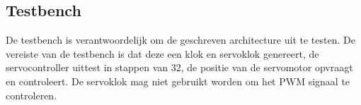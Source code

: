\subsection{Testbench}

De testbench is verantwoordelijk om de geschreven architecture uit te testen. De vereiste van de testbench is dat deze een klok en servoklok genereert, de servocontroller uittest in stappen van 32, de positie van de servomotor opvraagt en controleert. De servoklok mag niet gebruikt worden om het PWM signaal te controleren.